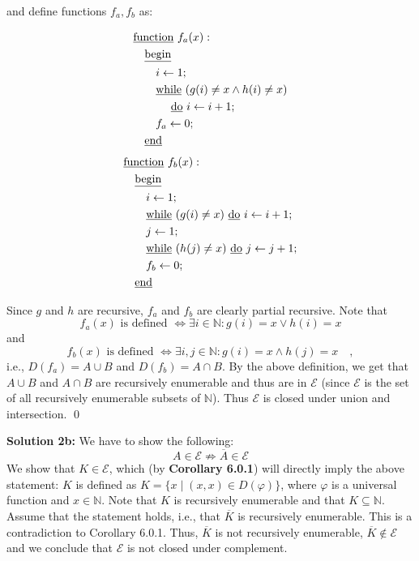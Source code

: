 \documentclass [11pt]{article}
\newcommand{\E}{\ensuremath{\mathcal{E}}}
\newcommand{\N}{\ensuremath{\mathbb{N}}}
\begin{document}
\noindent
and define functions $f_a, f_b$ as:
\begin{multicols}{2}
\noindent
\begin{align*}
& \text{\underline{function} } f_a(x): \\
& \quad \text{\underline{begin}} \\
& \quad \quad i \leftarrow 1; \\
& \quad \quad \text{\underline{while} } (g(i) \neq x \land h(i) \neq x) \\
& \quad \quad \quad \text{ \underline{do} } i \leftarrow i +1; \\
& \quad \quad f_a \leftarrow 0; \\
& \quad \text{\underline{end}}
\end{align*}
\begin{align*}
& \text{\underline{function} } f_b(x): \\
& \quad \text{\underline{begin}} \\
& \quad \quad i \leftarrow 1; \\
& \quad \quad \text{\underline{while} } (g(i) \neq x) \text{ \underline{do} } i \leftarrow i + 1; \\
& \quad \quad j \leftarrow 1; \\
& \quad \quad \text{\underline{while} } (h(j) \neq x) \text{ \underline{do} } j \leftarrow j + 1; \\
& \quad \quad f_b \leftarrow 0; \\
& \quad \text{\underline{end}}
\end{align*}
\end{multicols}
\noindent
Since $g$ and $h$ are recursive, $f_a$ and $f_b$ are clearly partial recursive. 
Note that 
$$
f_a(x) \text{ is defined } \iff \exists i \in \N: g(i) = x \lor h(i) = x
$$
and 
$$
f_b(x) \text{ is defined } \iff \exists i,j \in \N: g(i) = x \land h(j) = x \quad ,
$$
i.e., $D(f_a) = A \cup B$ and $D(f_b) = A \cap B$.
By the above definition, we get that $A\cup B$ and $A \cap B$ are recursively enumerable and thus are in $\E$ (since $\E$ is the set of all recursively enumerable subsets of \N). 
Thus $\E$ is closed under union and intersection. \qed

\bigskip
\noindent
\textbf{Solution 2b:}
We have to show the following:
$$
A \in \E \not \Rightarrow \overline{A} \in \E
$$
We show that $K \in \E$, which (by \textbf{Corollary 6.0.1}) will directly imply the above statement:
$K$ is defined as $ K = \{x\mid (x,x) \in D(\varphi) \}$, where $\varphi$ is a universal function and $x \in \N$. 
Note that $K$ is recursively enumerable and that $K \subseteq \N$. 
Assume that the statement holds, i.e., that $\overline{K}$ is recursively enumerable. 
This is a contradiction to Corollary 6.0.1.
Thus, $\overline{K}$ is not recursively enumerable, $\overline{K} \not \in \E$ and we conclude that $\E$ is not closed under complement.
\end{document}
